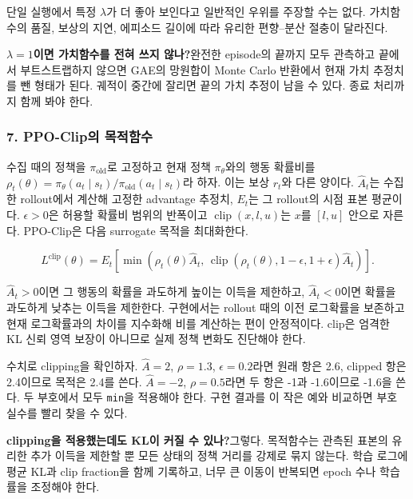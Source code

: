 \documentclass[11pt,a4paper]{article}
\begin{document}
단일 실행에서 특정 $\lambda$가 더 좋아 보인다고 일반적인 우위를 주장할 수는 없다. 가치함수의 품질, 보상의 지연, 에피소드 길이에 따라 유리한 편향–분산 절충이 달라진다.\par

\par\medskip\noindent\textbf{$\lambda=1$이면 가치함수를 전혀 쓰지 않나?}\quad 완전한 episode의 끝까지 모두 관측하고 끝에서 부트스트랩하지 않으면 GAE의 망원합이 Monte Carlo 반환에서 현재 가치 추정치를 뺀 형태가 된다. 궤적이 중간에 잘리면 끝의 가치 추정이 남을 수 있다. 종료 처리까지 함께 봐야 한다.\par

\subsubsection{7. PPO-Clip의 목적함수}

수집 때의 정책을 $\pi_{\mathrm{old}}$로 고정하고 현재 정책 $\pi_\theta$와의 행동 확률비를 $\rho_t(\theta)=\pi_\theta(a_t\mid s_t)/\pi_{\mathrm{old}}(a_t\mid s_t)$라 하자. 이는 보상 $r_t$와 다른 양이다. $\widehat A_t$는 수집한 rollout에서 계산해 고정한 advantage 추정치, $E_t$는 그 rollout의 시점 표본 평균이다. $\epsilon>0$은 허용할 확률비 범위의 반폭이고 $\operatorname{clip}(x,l,u)$는 $x$를 $[l,u]$ 안으로 자른다. PPO-Clip은 다음 surrogate 목적을 최대화한다.\par

\[
L^{\mathrm{clip}}(\theta)
=E_t\!\left[
\min\!\left(
\rho_t(\theta)\widehat A_t,\,
\operatorname{clip}(\rho_t(\theta),1-\epsilon,1+\epsilon)\widehat A_t
\right)\right].
\]

$\widehat A_t>0$이면 그 행동의 확률을 과도하게 높이는 이득을 제한하고, $\widehat A_t<0$이면 확률을 과도하게 낮추는 이득을 제한한다. 구현에서는 rollout 때의 이전 로그확률을 보존하고 현재 로그확률과의 차이를 지수화해 비를 계산하는 편이 안정적이다. clip은 엄격한 KL 신뢰 영역 보장이 아니므로 실제 정책 변화도 진단해야 한다.\par

수치로 clipping을 확인하자. $\widehat A=2$, $\rho=1.3$, $\epsilon=0.2$라면 원래 항은 2.6, clipped 항은 2.4이므로 목적은 2.4를 쓴다. $\widehat A=-2$, $\rho=0.5$라면 두 항은 -1과 -1.6이므로 -1.6을 쓴다. 두 부호에서 모두 \texttt{min}을 적용해야 한다. 구현 결과를 이 작은 예와 비교하면 부호 실수를 빨리 찾을 수 있다.\par

\par\medskip\noindent\textbf{clipping을 적용했는데도 KL이 커질 수 있나?}\quad 그렇다. 목적함수는 관측된 표본의 유리한 추가 이득을 제한할 뿐 모든 상태의 정책 거리를 강제로 묶지 않는다. 학습 로그에 평균 KL과 clip fraction을 함께 기록하고, 너무 큰 이동이 반복되면 epoch 수나 학습률을 조정해야 한다.\par
\end{document}
